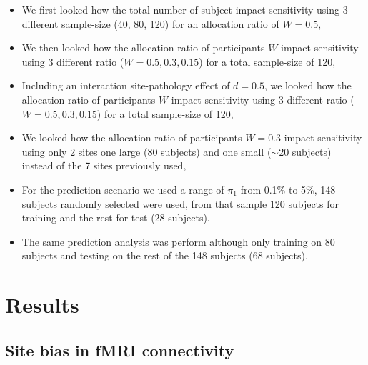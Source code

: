 \documentclass[authoryear]{elsarticle}
\begin{document}
\begin{itemize}
 \item We first looked how the total number of subject impact sensitivity using 3 different sample-size (40, 80, 120) for an allocation ratio of $W=0.5$,
 \item We then looked how the allocation ratio of participants $W$ impact sensitivity using 3 different ratio ($W=0.5,0.3,0.15$) for a total sample-size of 120,
 \item Including an interaction site-pathology effect of $d=0.5$, we looked how the allocation ratio of participants $W$ impact sensitivity using 3 different ratio ($W=0.5,0.3,0.15$) for a total sample-size of 120,
 \item We looked how the allocation ratio of participants $W=0.3$ impact sensitivity using only 2 sites one large (80 subjects) and one small ($\sim20$ subjects) instead of the 7 sites previously used,
 \item For the prediction scenario we used a range of $\pi_1$ from 0.1\% to 5\%, 148 subjects randomly selected were used, from that sample 120 subjects for training and the rest for test (28 subjects).
 \item The same prediction analysis was perform although only training on 80 subjects and testing on the rest of the 148 subjects (68 subjects).
\end{itemize}


\section{Results}

\subsection{Site bias in fMRI connectivity}
\end{document}
